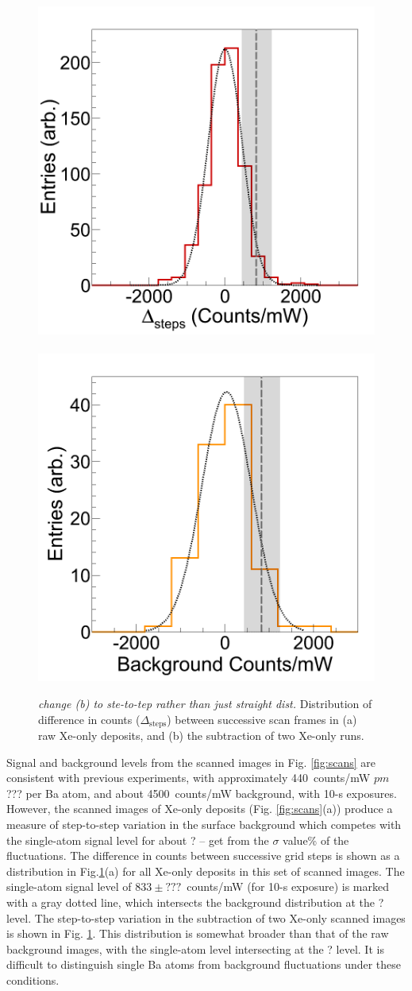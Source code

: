 \begin{figure} %
        \centering
                \includegraphics[width=.5\textwidth]{figures/xevar_scanDelta.png}
                ~
                \includegraphics[width=.5\textwidth]{figures/xevar_scanSubtraction.png}
                \caption{\emph{\color{gray}change (b) to ste-to-tep rather than just straight dist.}  Distribution of difference in counts ($\Delta_{\text{steps}}$) between successive scan frames in (a) raw Xe-only deposits, and (b) the subtraction of two Xe-only runs.}
\label{fig:scanVarXe}
\end{figure}

Signal and background levels from the scanned images in Fig. \ref{fig:scans} are consistent with previous experiments, with approximately 440~counts/mW {\color{red}$pm$ ???} per Ba atom, and about 4500~counts/mW background, with 10-s exposures.  However, the scanned images of Xe-only deposits (Fig. \ref{fig:scans}(a)) produce a measure of step-to-step variation in the surface background which competes with the single-atom signal level for about {\color{red}? -- get from the $\sigma$ value}\% of the fluctuations.  The difference in counts between successive grid steps is shown as a distribution in Fig.\ref{fig:scanVarXe}(a) for all Xe-only deposits in this set of scanned images.  The single-atom signal level of {\color{red}$833 \pm ???$}~counts/mW (for 10-s exposure) is marked with a gray dotted line, which intersects the background distribution at the ? level.  The step-to-step variation in the subtraction of two Xe-only scanned images is shown in Fig. \ref{fig:scanVarXe}.  This distribution is somewhat broader than that of the raw background images, with the single-atom level intersecting at the ? level.  It is difficult to distinguish single Ba atoms from background fluctuations under these conditions.

